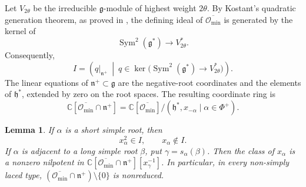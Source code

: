 \documentclass[12pt]{article}
\newtheorem{lemma}[theorem]{Lemma}
\theoremstyle{definition}
\DeclareMathOperator{\Sym}{Sym}
\newcommand{\C}{\mathbb C}
\newcommand{\g}{\mathfrak g}
\newcommand{\h}{\mathfrak h}
\newcommand{\n}{\mathfrak n^{+}}
\newcommand{\oc}{\overline{\mathcal O_{\min}}}
\begin{document}
Let $V_{2\theta}$ be the irreducible $\g$-module of highest weight $2\theta$. By Kostant's quadratic generation theorem, as proved in \cite[Chapter~III, \S2, Theorem~1]{Gar82}, the defining ideal of $\oc$ is generated by the kernel of
$$
    \Sym^2(\g^*)\longrightarrow V_{2\theta}^*.
$$
Consequently,
\begin{equation}\label{eq:restricted}
    I=\left(q|_{\n}\ \middle|\ q\in
    \ker\bigl(\Sym^2(\g^*)\longrightarrow V_{2\theta}^*\bigr)\right).
\end{equation}
The linear equations of $\n\subset\g$ are the negative-root coordinates and the elements of $\h^*$, extended by zero on the root spaces. The resulting coordinate ring is
\begin{equation}\label{eq:quotient}
    \C[\oc\cap\n]
    =\C[\oc]/(\h^*,x_{-\alpha}\mid\alpha\in\Phi^+).
\end{equation}
\begin{lemma}\label{lem:short}
    If $\alpha$ is a short simple root, then
    $$
        x_\alpha^2\in I,\qquad x_\alpha\notin I.
    $$
    If $\alpha$ is adjacent to a long simple root $\beta$, put $\gamma=s_\alpha(\beta)$. Then the class of $x_\alpha$ is a nonzero nilpotent in $\C[\oc\cap\n][x_\gamma^{-1}]$. In particular, in every non-simply laced type, $(\oc\cap\n)\setminus\{0\}$ is nonreduced.
\end{lemma}
\end{document}
